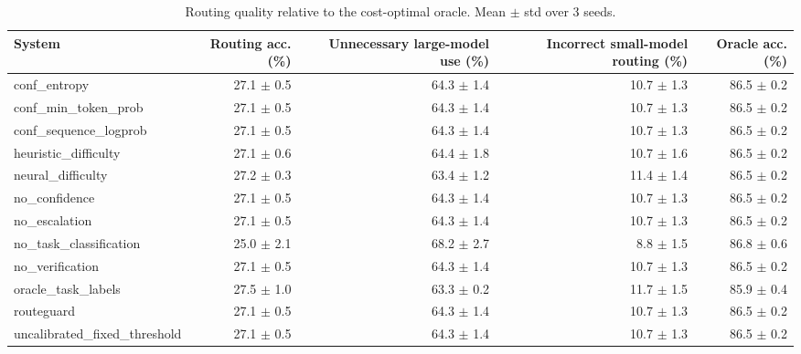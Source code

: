 \begin{table}[t]
\centering
\small
\caption{Routing quality relative to the cost-optimal oracle. Mean $\pm$ std over 3 seeds.}
\label{tab:routing}
\begin{tabular}{lrrrr}
\toprule
System & Routing acc. (\%) & Unnecessary large-model use (\%) & Incorrect small-model routing (\%) & Oracle acc. (\%) \\
\midrule
conf\_entropy & 27.1 $\pm$ 0.5 & 64.3 $\pm$ 1.4 & 10.7 $\pm$ 1.3 & 86.5 $\pm$ 0.2 \\
conf\_min\_token\_prob & 27.1 $\pm$ 0.5 & 64.3 $\pm$ 1.4 & 10.7 $\pm$ 1.3 & 86.5 $\pm$ 0.2 \\
conf\_sequence\_logprob & 27.1 $\pm$ 0.5 & 64.3 $\pm$ 1.4 & 10.7 $\pm$ 1.3 & 86.5 $\pm$ 0.2 \\
heuristic\_difficulty & 27.1 $\pm$ 0.6 & 64.4 $\pm$ 1.8 & 10.7 $\pm$ 1.6 & 86.5 $\pm$ 0.2 \\
neural\_difficulty & 27.2 $\pm$ 0.3 & 63.4 $\pm$ 1.2 & 11.4 $\pm$ 1.4 & 86.5 $\pm$ 0.2 \\
no\_confidence & 27.1 $\pm$ 0.5 & 64.3 $\pm$ 1.4 & 10.7 $\pm$ 1.3 & 86.5 $\pm$ 0.2 \\
no\_escalation & 27.1 $\pm$ 0.5 & 64.3 $\pm$ 1.4 & 10.7 $\pm$ 1.3 & 86.5 $\pm$ 0.2 \\
no\_task\_classification & 25.0 $\pm$ 2.1 & 68.2 $\pm$ 2.7 & 8.8 $\pm$ 1.5 & 86.8 $\pm$ 0.6 \\
no\_verification & 27.1 $\pm$ 0.5 & 64.3 $\pm$ 1.4 & 10.7 $\pm$ 1.3 & 86.5 $\pm$ 0.2 \\
oracle\_task\_labels & 27.5 $\pm$ 1.0 & 63.3 $\pm$ 0.2 & 11.7 $\pm$ 1.5 & 85.9 $\pm$ 0.4 \\
routeguard & 27.1 $\pm$ 0.5 & 64.3 $\pm$ 1.4 & 10.7 $\pm$ 1.3 & 86.5 $\pm$ 0.2 \\
uncalibrated\_fixed\_threshold & 27.1 $\pm$ 0.5 & 64.3 $\pm$ 1.4 & 10.7 $\pm$ 1.3 & 86.5 $\pm$ 0.2 \\
\bottomrule
\end{tabular}
\end{table}
